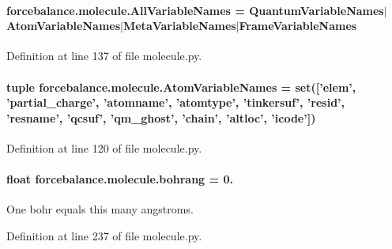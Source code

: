 \hypertarget{namespaceforcebalance_1_1molecule_a8fcfb88fe12a9256b61980f3d4fe3b63}{
\paragraph[{All\-Variable\-Names}]{\setlength{\rightskip}{0pt plus 5cm}forcebalance.\-molecule.\-All\-Variable\-Names = {\bf Quantum\-Variable\-Names}$|${\bf Atom\-Variable\-Names}$|${\bf Meta\-Variable\-Names}$|${\bf Frame\-Variable\-Names}}}\label{namespaceforcebalance_1_1molecule_a8fcfb88fe12a9256b61980f3d4fe3b63}


Definition at line 137 of file molecule.\-py.

\hypertarget{namespaceforcebalance_1_1molecule_a5daa68e835dcb9877d6c3f2fb559b54b}{
\paragraph[{Atom\-Variable\-Names}]{\setlength{\rightskip}{0pt plus 5cm}tuple forcebalance.\-molecule.\-Atom\-Variable\-Names = set(\mbox{[}'elem', 'partial\-\_\-charge', 'atomname', 'atomtype', 'tinkersuf', 'resid', 'resname', 'qcsuf', 'qm\-\_\-ghost', 'chain', 'altloc', 'icode'\mbox{]})}}\label{namespaceforcebalance_1_1molecule_a5daa68e835dcb9877d6c3f2fb559b54b}


Definition at line 120 of file molecule.\-py.

\hypertarget{namespaceforcebalance_1_1molecule_a76af9edfbaaa8999680e32aafe1b1b61}{
\paragraph[{bohrang}]{\setlength{\rightskip}{0pt plus 5cm}float forcebalance.\-molecule.\-bohrang = 0.}}\label{namespaceforcebalance_1_1molecule_a76af9edfbaaa8999680e32aafe1b1b61}


One bohr equals this many angstroms. 



Definition at line 237 of file molecule.\-py.

